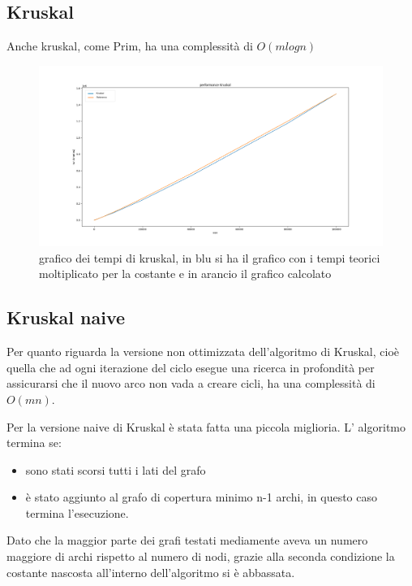 \subsection{Kruskal}
Anche kruskal, come Prim, ha una complessità di $O(mlogn)$

\begin{figure}[htbp]
    \centering
    \centerline{\includegraphics[scale = 0.38]{Fig/KruskalFinale.png}}
    \caption{grafico dei tempi di kruskal,  in blu si ha il grafico con i tempi teorici moltiplicato per la costante e in arancio il grafico calcolato}
    \label{Kruskal}
\end{figure}

\newpage
\subsection{Kruskal naive}
Per quanto riguarda la versione non ottimizzata dell'algoritmo di Kruskal, cioè quella che ad ogni iterazione del ciclo esegue una ricerca in profondità per assicurarsi che il nuovo arco non vada a creare cicli, ha una complessità di $O(mn)$.

Per la versione naive di Kruskal è stata fatta una piccola miglioria. L' algoritmo termina se:
\begin{itemize}
    \item sono stati scorsi tutti i lati del grafo
    \item è stato aggiunto al grafo di copertura minimo n-1 archi, in questo caso termina l'esecuzione.
\end{itemize}
Dato che la maggior parte dei grafi testati mediamente aveva un numero maggiore di archi rispetto al numero di nodi, grazie alla seconda condizione la costante nascosta all'interno dell'algoritmo si è abbassata. 

